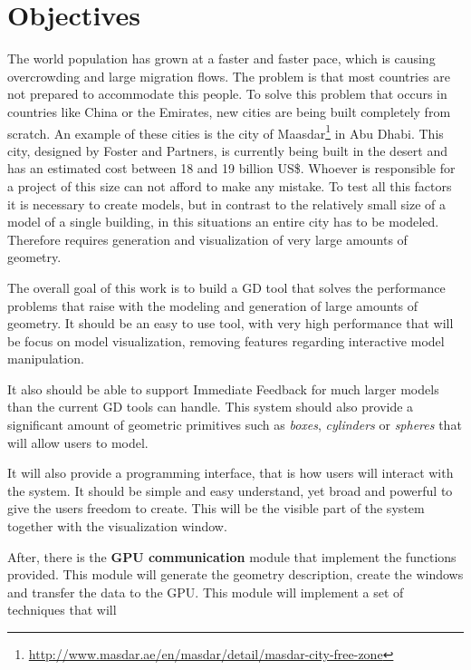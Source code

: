 
% 
% 

\section{Objectives}
\label{sec:objectives}

The world population has grown at a faster and faster pace, which is causing overcrowding and large migration flows. The problem is that most countries are not prepared to accommodate this people. 
To solve this problem that occurs in countries like China or the Emirates, new cities are being built  completely from scratch. An example of these cities is the city of Maasdar\footnote{\url{http://www.masdar.ae/en/masdar/detail/masdar-city-free-zone}} in Abu Dhabi. This city, designed by Foster and Partners, is currently being built in the desert and has an estimated cost between 18 and 19 billion US\$. Whoever is responsible for a project of this size can not afford to make any mistake.
To test all this factors it is necessary to create models, but in contrast to the relatively small size of a model of a single building, in this situations an entire city has to be modeled. Therefore requires generation and visualization of very large amounts of geometry.

The overall goal of this work is to build a GD tool that solves the performance problems that raise with the modeling and generation of large amounts of geometry. It should be an easy to use tool, with very high performance that will be focus on model visualization, removing features regarding interactive model manipulation.

It also should be able to support Immediate Feedback for much larger models than the current GD tools can handle. This system should also provide a significant amount of geometric primitives such as \emph{boxes}, \emph{cylinders} or \emph{spheres} that will allow users to model.

It will also provide a programming interface, that is how users will interact with the system. It should be simple and easy understand, yet broad and powerful to give the users freedom to create. This will be the visible part of the system together with the visualization window.

After, there is the \textbf{GPU communication} module that implement the functions provided. This module will generate the geometry description, create the windows and transfer the data to the GPU. This module will implement a set of techniques that will 

